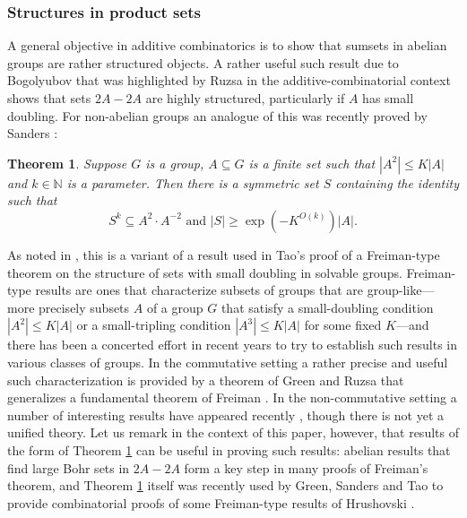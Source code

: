 \documentclass[12pt,a4paper,reqno]{amsart}
\numberwithin{equation}{section}
\theoremstyle{plain}
\newtheorem{theorem}{Theorem}[section]
\theoremstyle{definition}
\renewcommand{\leq}{\leqslant}
\renewcommand{\geq}{\geqslant}
\renewcommand{\subset}{\subseteq}
\def\N{\mathbb{N}}
\begin{document}
\subsubsection*{Structures in product sets}
A general objective in additive combinatorics is to show that sumsets in abelian groups are rather structured objects. A rather useful such result due to Bogolyubov \cite{bogolyubov} that was highlighted by Ruzsa \cite{ruzsa:Freiman} in the additive-combinatorial context shows that sets $2A - 2A$ are highly structured, particularly if $A$ has small doubling. For non-abelian groups an analogue of this was recently proved by Sanders \cite{sanders:non-abelian-balog-szemeredi}:

\begin{theorem}\label{sanders-core}
Suppose $G$ is a group, $A \subset G$ is a finite set such that $|A^2| \leq K|A|$ and $k \in \N$ is a parameter. Then there is a symmetric set $S$ containing the identity such that
\[ S^k \subset A^2 \cdot A^{-2}  \text{ and }  |S| \geq \exp\left(-K^{O(k)}\right) |A|. \]
\end{theorem}

As noted in \cite{sanders:non-abelian-balog-szemeredi}, this is a variant of a result used in Tao's proof \cite{tao:solvable-freiman} of a Freiman-type theorem on the structure of sets with small doubling in solvable groups. Freiman-type results are ones that characterize subsets of groups that are group-like---more precisely subsets $A$ of a group $G$ that satisfy a small-doubling condition $|A^2| \leq K|A|$ or a small-tripling condition $|A^3| \leq K|A|$ for some fixed $K$---and there has been a concerted effort in recent years to try to establish such results in various classes of groups. In the commutative setting a rather precise and useful such characterization is provided by a theorem of Green and Ruzsa \cite{green-ruzsa:freiman} that generalizes a fundamental theorem of Freiman \cite{freiman}. In the non-commutative setting a number of interesting results have appeared recently \cite{breuillard-green1, breuillard-green2, breuillard-green-tao, FKP, hrushovski, pyber-szabo, tao:solvable-freiman}, though there is not yet a unified theory. Let us remark in the context of this paper, however, that results of the form of Theorem \ref{sanders-core} can be useful in proving such results: abelian results that find large Bohr sets in $2A-2A$ form a key step in many proofs of Freiman's theorem, and Theorem \ref{sanders-core} itself was recently used by Green, Sanders and Tao \cite{green-sanders-tao} to provide combinatorial proofs of some Freiman-type results of Hrushovski \cite{hrushovski}.
\end{document}
